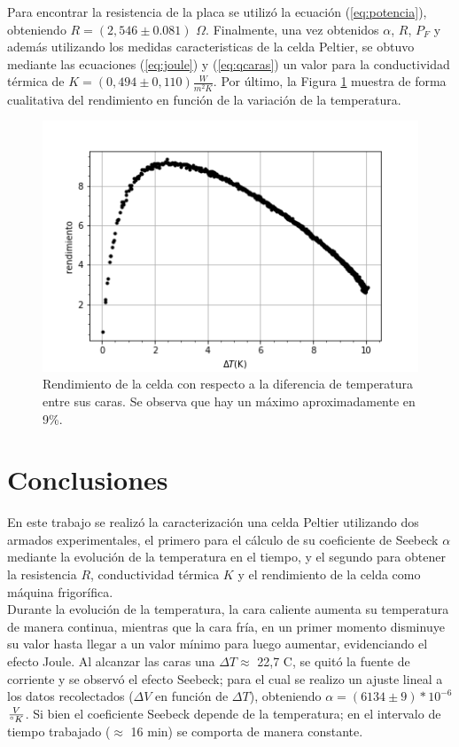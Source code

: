 \documentclass[twoside,twocolumn,a4paper]{article}
\begin{document}
Para encontrar la resistencia de la placa se utiliz\'o la ecuaci\'on (\ref{eq:potencia}), obteniendo $R = (2,546 \pm 0.081)$ $\Omega$. Finalmente, una vez obtenidos $\alpha$, $R$, $P_{F}$ y adem\'as utilizando los medidas caracteristicas de la celda Peltier, se obtuvo mediante las ecuaciones (\ref{eq:joule}) y (\ref{eq:qcaras}) un valor para la conductividad t\'ermica de  $K = (0,494 \pm 0,110) \frac{W}{m^{2} K}$. Por \'ultimo, la Figura \ref{fig:rendimiento} muestra de forma cualitativa del rendimiento en funci\'on de la variaci\'on de la temperatura. 

\begin{figure}[H]
\includegraphics[width=\linewidth]{curva_rendimiento.png}
\caption{Rendimiento de la celda con respecto a la diferencia de temperatura entre sus caras. Se observa que hay un m\'aximo aproximadamente en 9\%. }
\label{fig:rendimiento}
\end{figure}


\section{Conclusiones}

En este trabajo se realiz\'o la caracterizaci\'on una celda Peltier utilizando dos armados experimentales, el primero para el c\'alculo de su coeficiente de Seebeck $\alpha$ mediante la evoluci\'on de la temperatura en el tiempo, y el segundo para obtener la resistencia $R$, conductividad t\'ermica $K$ y el rendimiento de la celda como m\'aquina frigor\'ifica.\\

Durante la evoluci\'on de la temperatura, la cara caliente aumenta su temperatura de manera continua, mientras que la cara fr\'ia, en un primer momento disminuye su valor hasta llegar a un valor m\'inimo para luego aumentar, evidenciando el efecto Joule. Al alcanzar las caras una $\Delta T \approx$  22,7 \degree C, se quit\'o la fuente de corriente y se observ\'o el efecto Seebeck; para el cual se realizo un ajuste lineal a los datos recolectados ($\Delta V$ en funci\'on de $\Delta T$), obteniendo $\alpha = (6134 \pm 9) * 10^{-6}$ $\frac{V}{\degree K}$. Si bien el coeficiente Seebeck depende de la temperatura; en el intervalo de tiempo trabajado ($\approx$ 16 min) se comporta de manera constante.\\	
\end{document}
